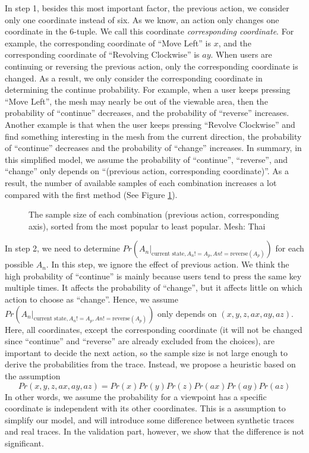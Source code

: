 In step 1, besides this most important factor, the previous action, we consider only one coordinate instead of six.
As we know, an action only changes one coordinate in the 6-tuple. We call this coordinate \textit{corresponding coordinate}.
For example, the corresponding coordinate of ``Move Left'' is $x$, and the corresponding coordinate of 
``Revolving Clockwise'' is $ay$. 
When users are continuing or reversing the previous action, 
only the corresponding coordinate is changed. 
As a result, we only consider the corresponding coordinate in determining the continue probability. 
For example, when a user keeps pressing ``Move Left'', the mesh may nearly be out of the viewable area, 
then the probability of ``continue'' decreases, and the probability of ``reverse'' increases. 
Another example is that when the user keeps pressing ``Revolve Clockwise'' and find something interesting
in the mesh from the current direction,
the probability of ``continue'' decreases and the probability of ``change'' increases.
In summary, in this simplified model, we assume the probability of ``continue'', ``reverse'', and ``change''
only depends on ``(previous action, corresponding coordinate)''.
As a result, the number of available samples of each combination increases a lot compared with the first method
(See Figure \ref{f:user:newsample}). 
\begin{figure}
    \centering
    \caption{The sample size of each combination (previous action, corresponding axis), 
    sorted from the most popular to least popular.  Mesh: Thai}
    \label{f:user:newsample}
\end{figure}

In step 2, we need to determine $Pr(A_n |_{\textrm{current state}, A_n != A_p, An != \textrm{reverse}(A_p)})$
for each possible $A_n$. In this step, we ignore the effect of previous action. 
We think the high probability of ``continue'' is mainly because users tend to press the same key multiple times. 
It affects the probability of ``change'', but it affects little on which action to choose as ``change''.
Hence, we assume $Pr(A_n |_{\textrm{current state}, A_n != A_p, An != \textrm{reverse}(A_p)})$
only depends on $(x, y, z, ax, ay, az)$. Here, all coordinates, except the corresponding coordinate
(it will not be changed since ``continue'' and ``reverse'' are already excluded from the choices),
are important to decide the next action, so the sample size is not large enough to derive the probabilities
from the trace.
Instead, we propose a heuristic based on the assumption
\[
    Pr(x, y, z, ax, ay, az) = Pr(x)Pr(y)Pr(z)Pr(ax)Pr(ay)Pr(az)
\]
In other words, we assume the probability for a viewpoint has a specific coordinate is independent with its 
other coordinates. This is a assumption to simplify our model, and will introduce some difference between
synthetic traces and real traces. In the validation part, however, we show that the difference is not 
significant.

